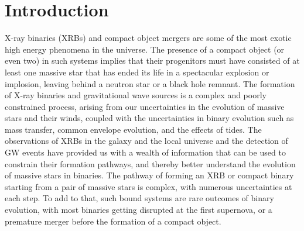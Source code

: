 \documentclass[linenumbers,trackchanges,twocolumn]{aastex701}
\begin{document}

\section{Introduction}

X-ray binaries (XRBs) and compact object mergers are some of the most exotic high energy phenomena in the universe. The presence of a compact object (or even two) in such systems implies that their progenitors must have consisted of at least one massive star that has ended its life in a spectacular explosion or implosion, leaving behind a neutron star or a black hole remnant. The formation of X-ray binaries and gravitational wave sources is a complex and poorly constrained process, arising from our uncertainties in the evolution of massive stars and their winds, coupled with the uncertainties in binary evolution such as mass transfer, common envelope evolution, and the effects of tides. The observations of XRBs in the galaxy and the local universe and the detection of GW events have provided us with a wealth of information that can be used to constrain their formation pathways, and thereby better understand the evolution of massive stars in binaries. The pathway of forming an XRB or compact binary starting from a pair of massive stars is complex, with numerous uncertainties at each step. To add to that, such bound systems are rare outcomes of binary evolution, with most binaries getting disrupted at the first supernova, or a premature merger before the formation of a compact object. 
\end{document}
